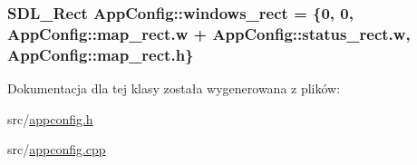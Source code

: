 \subsubsection[{windows\+\_\+rect}]{\setlength{\rightskip}{0pt plus 5cm}S\+D\+L\+\_\+\+Rect App\+Config\+::windows\+\_\+rect = \{0, 0, App\+Config\+::map\+\_\+rect.\+w + App\+Config\+::status\+\_\+rect.\+w, App\+Config\+::map\+\_\+rect.\+h\}\hspace{0.3cm}{\ttfamily [static]}}\label{class_app_config_a3084e1368b670ab054843b2adf17c1b8}


Dokumentacja dla tej klasy została wygenerowana z plików\+:\begin{DoxyCompactItemize}
\item 
src/\hyperlink{appconfig_8h}{appconfig.\+h}\item 
src/\hyperlink{appconfig_8cpp}{appconfig.\+cpp}\end{DoxyCompactItemize}
